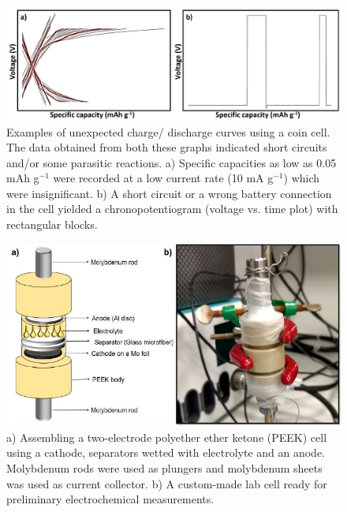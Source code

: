\begin{figure}[tbh!]
\centering
\includegraphics[width=\textwidth]{Figures/chap3fig/weirdcdc}
\caption{Examples of unexpected charge/ discharge curves using a coin cell. The data obtained from both these graphs indicated short circuits and/or some parasitic reactions. a) Specific capacities as low as 0.05 mAh g$^{-1}$ were recorded at a low current rate (10 mA g$^{-1}$) which were insignificant. b) A short circuit or a wrong battery connection in the cell yielded a chronopotentiogram (voltage vs. time plot) with rectangular blocks.}
\label{Figures/chap3fig:weirdcdc}
\end{figure}

\begin{figure}[tbh!]
\centering
\includegraphics[width=\textwidth]{Figures/chap3fig/swagelok.pdf}
\caption{a) Assembling a two-electrode polyether ether ketone (PEEK) cell using a cathode, separators wetted with electrolyte and an anode. Molybdenum rods were used as plungers and molybdenum sheets was used as current collector. b) A custom-made lab cell ready for preliminary electrochemical measurements.}
\label{Figures/chap3fig:swagelok}
\end{figure}

